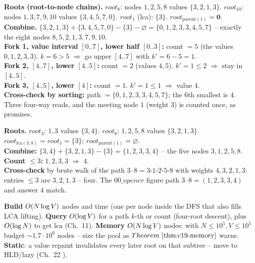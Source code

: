 \begin{tracebox}
\textbf{Roots (root-to-node chains).} \(\mathit{root}_8\): nodes \(1,2,5,8\) values \(\{3,2,1,3\}\). \(\mathit{root}_{10}\): nodes \(1,3,7,9,10\) values \(\{3,4,5,7,0\}\). \(\mathit{root}_1\) (lca): \(\{3\}\). \(\mathit{root}_{\mathrm{parent}(1)}=\mathbf{0}\).\\
\textbf{Combine.} \(\{3,2,1,3\}+\{3,4,5,7,0\}-\{3\}-\varnothing=\{0,1,2,3,3,4,5,7\}\) -- exactly the eight nodes \(8,5,2,1,3,7,9,10\).\\
\textbf{Fork 1, value interval \([0..7]\), lower half \([0..3]\):} count \(=5\) (the values \(0,1,2,3,3\)).  \(k=6>5\) \(\Rightarrow\) go upper \([4..7]\) with \(k'=6-5=1\).\\
\textbf{Fork 2, \([4..7]\), lower \([4..5]\):} count \(=2\) (values \(4,5\)).  \(k'=1\le2\) \(\Rightarrow\) stay in \([4..5]\).\\
\textbf{Fork 3, \([4..5]\), lower \([4]\):} count \(=1\).  \(k'=1\le1\) \(\Rightarrow\) value \(\boxed{4}\).\\
\textbf{Cross-check by sorting:} path \(=\{0,1,2,3,3,4,5,7\}\); the 6th smallest is \(4\).  Three four-way reads, and the meeting node \(1\) (weight \(3\)) is counted once, as  promises.
\end{tracebox}

\begin{tracebox}[count values <= 3 on path 3 to 8 -- the four-root sum is 4]
\textbf{Roots.} \(\mathit{root}_3\): \(1,3\) values \(\{3,4\}\).  \(\mathit{root}_8\): \(1,2,5,8\) values \(\{3,2,1,3\}\).  \(\mathit{root}_{\mathrm{lca}(3,8)}=\mathit{root}_1=\{3\}\); \(\mathit{root}_{\mathrm{parent}(1)}=\varnothing\).\\
\textbf{Combine:} \(\{3,4\}+\{3,2,1,3\}-\{3\}=\{1,2,3,3,4\}\) -- the five nodes \(3,1,2,5,8\).\\
\textbf{Count \(\le 3\):} \(1,2,3,3\) \(\Rightarrow\) \(\boxed{4}\).\\
\textbf{Cross-check} by brute walk of the path \(3\text{--}8=3\text{-}1\text{-}2\text{-}5\text{-}8\) with weights \(4,3,2,1,3\): entries \(\le3\) are \(3,2,1,3\) -- four.  The \(00\_opener\) figure path \(3\text{--}8=(1,2,3,3,4)\) and answer \(4\) match.
\end{tracebox}

\begin{complexitybox}
\textbf{Build} \(O(N\log V)\) nodes and time (one  per node inside the DFS that also fills LCA lifting). \textbf{Query} \(O(\log V)\) for a path \(k\)-th or count (four-root descent), plus \(O(\log N)\) to get \(\mathrm{lca}\) (Ch.~11). \textbf{Memory} \(O(N\log V)\) nodes: with \(N\le10^5,V\le10^5\) budget \(\sim1.7\cdot10^6\) nodes -- size the pool as \(\thmref{c19-memory}\) warns. \textbf{Static}: a value repaint invalidates every later root on that subtree -- move to HLD/lazy (Ch.~22 ).
\end{complexitybox}

